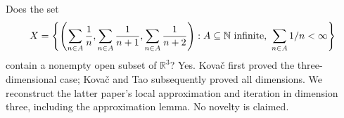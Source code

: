 Does the set
\[
 X=\left\{\left(\sum_{n\in A}\frac1n,
 \sum_{n\in A}\frac1{n+1},\sum_{n\in A}\frac1{n+2}\right):
 A\subseteq\mathbb N\hbox{ infinite},\ \sum_{n\in A}1/n<\infty\right\}
\]
contain a nonempty open subset of $\mathbb R^3$? Yes. Kova\v c first proved the three-dimensional case; Kova\v c and Tao subsequently proved all dimensions. We reconstruct the latter paper's local approximation and iteration in dimension three, including the approximation lemma. No novelty is claimed.
